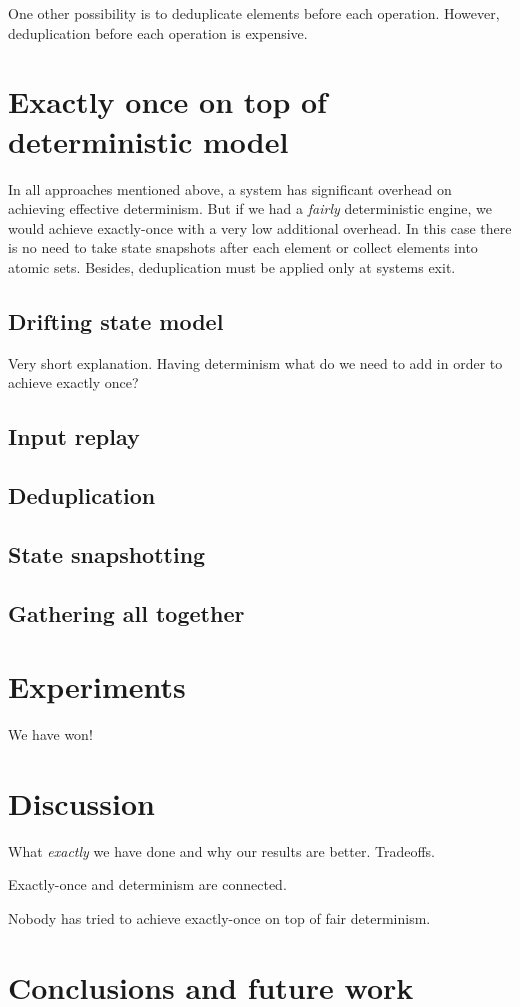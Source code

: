 \documentclass[sigconf]{acmart}
\theoremstyle{remark}
\begin{document}
One other possibility is to deduplicate elements before each operation. However, deduplication before each operation is expensive.

\section{Exactly once on top of deterministic model}

In all approaches mentioned above, a system has significant overhead on achieving effective determinism. But if we had a {\em fairly} deterministic engine, we would achieve exactly-once with a very low additional overhead. In this case there is no need to take state snapshots after each element or collect elements into atomic sets. Besides, deduplication must be applied only at systems exit.

\subsection{Drifting state model}

Very short explanation. Having determinism what do we need to add in order to achieve exactly once?

\subsection{Input replay}

\subsection{Deduplication}

\subsection{State snapshotting}

\subsection{Gathering all together}

\section{Experiments}

We have won!

\section{Discussion}

What {\em exactly} we have done and why our results are better. Tradeoffs.

Exactly-once and determinism are connected.

Nobody has tried to achieve exactly-once on top of fair determinism.

\section{Conclusions and future work}




\end{document}
